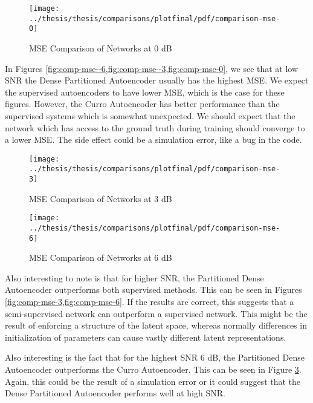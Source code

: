 \begin{figure}[!ht]
\centering
\texttt{[image: ../thesis/thesis/comparisons/plotfinal/pdf/comparison-mse-0]}
\caption{MSE Comparison of Networks at 0 dB}\label{fig:comp-mse-0}
\end{figure}

In Figures \cref{fig:comp-mse--6,fig:comp-mse--3,fig:comp-mse-0}, we see that at low SNR the Dense Partitioned Autoencoder usually has the highest MSE. We expect the supervised autoencoders to have lower MSE, which is the case for these figures. However, the Curro Autoencoder has better performance than the supervised systems which is somewhat unexpected. We should expect that the network which has access to the ground truth during training should converge to a lower MSE. The side effect could be a simulation error, like a bug in the code.

\begin{figure}[!ht]
\centering
\texttt{[image: ../thesis/thesis/comparisons/plotfinal/pdf/comparison-mse-3]}
\caption{MSE Comparison of Networks at 3 dB}\label{fig:comp-mse-3}
\end{figure}

\begin{figure}[!ht]
\centering
\texttt{[image: ../thesis/thesis/comparisons/plotfinal/pdf/comparison-mse-6]}
\caption{MSE Comparison of Networks at 6 dB}\label{fig:comp-mse-6}
\end{figure}

Also interesting to note is that for higher SNR, the Partitioned Dense Autoencoder outperforms both supervised methods. This can be seen in Figures \cref{fig:comp-mse-3,fig:comp-mse-6}. If the results are correct, this suggests that a semi-supervised network can outperform a supervised network. This might be the result of enforcing a structure of the latent space, whereas normally differences in initialization of parameters can cause vastly different latent representations.

Also interesting is the fact that for the highest SNR 6 dB, the Partitioned Dense Autoencoder outperforms the Curro Autoencoder. This can be seen in Figure \ref{fig:comp-mse-6}. Again, this could be the result of a simulation error or it could suggest that the Dense Partitioned Autoencoder performs well at high SNR.
